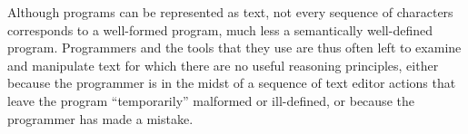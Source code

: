






Although programs can be represented as text, not
every sequence of characters corresponds to a well-formed program, much
less a semantically well-defined program. Programmers and the tools that they use are thus 
often left to examine and manipulate text for which there are no useful
reasoning principles, either because the programmer is in the midst of a sequence of
text editor actions that leave the program ``temporarily'' malformed or ill-defined, or because the programmer has made a mistake.

